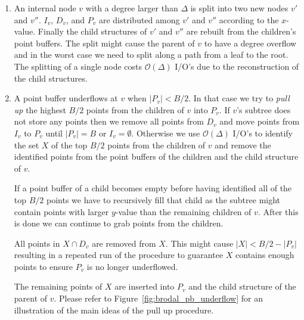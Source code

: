 \documentclass[twoside,11pt,openright]{report}
\begin{document}
\begin{enumerate}[label=(\roman*)]
	\item\label{update:deg} An internal node $v$ with a degree larger than $\Delta$ is split into two new nodes $v'$ and $v''$. $I_v$, $D_v$, and $P_v$ are distributed among $v'$ and $v''$ according to the $x$-value. Finally the child structures of $v'$ and $v''$ are rebuilt from the children's point buffers. The split might cause the parent of $v$ to have a degree overflow and in the worst case we need to split along a path from a leaf to the root. The splitting of a single node costs $\mathcal{O}(\Delta)$ I/O's due to the reconstruction of the child structures.
	
	\item\label{update:pbu} A point buffer underflows at $v$ when $\vert P_v \vert < B/2$. In that case we try to \textit{pull up} the highest $B/2$ points from the children of $v$ into $P_v$. If $v$'s subtree does not store any points then we remove all points from $D_v$ and move points from $I_v$ to $P_v$ until $\vert P_v \vert = B$ or $I_v = \emptyset$.
	Otherwise we use $\mathcal{O}(\Delta)$ I/O's to identify the set $X$ of the top $B/2$ points from the children of $v$ and remove the identified points from the point buffers of the children and the child structure of $v$.

	If a point buffer of a child becomes empty before having identified all of the top $B/2$ points we have to recursively fill that child as the subtree might contain points with larger $y$-value than the remaining children of $v$. After this is done we can continue to grab points from the children.
	
	All points in $X \cap D_v$ are removed from $X$. This might cause $\lvert X \rvert < B/2 - \lvert P_v \rvert$ resulting in a repeated run of the procedure to guarantee $X$ contains enough points to ensure $P_v$ is no longer underflowed.
	
	The remaining points of $X$ are inserted into $P_v$ and the child structure of the parent of $v$. Please refer to Figure~\ref{fig:brodal_pb_underflow} for an illustration of the main ideas of the pull up procedure.
	

\end{enumerate}
\end{document}

